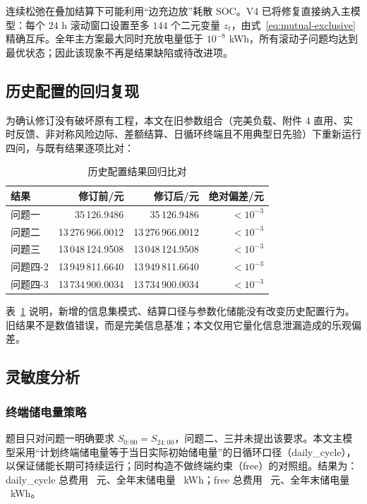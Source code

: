 连续松弛在叠加结算下可能利用“边充边放”耗散 SOC。V4 已将修复直接纳入主模型：每个 $24$ h 滚动窗口设置至多 $144$ 个二元变量 $z_t$，由式~\eqref{eq:mutual-exclusive} 精确互斥。全年主方案最大同时充放电量低于 $10^{-8}$ kWh，所有滚动子问题均达到最优状态；因此该现象不再是结果缺陷或待改进项。

\subsection{历史配置的回归复现}

为确认修订没有破坏原有工程，本文在旧参数组合（完美负载、附件 4 直用、实时反馈、非对称风险边际、差额结算、日循环终端且不用典型日先验）下重新运行四问，与既有结果逐项比对：

\begin{table}[htbp]
	\caption{历史配置结果回归比对}
	\label{tab:regression}
	\centering
	\begin{tabular}{l r r r}
		\toprule
		结果 & 修订前/元 & 修订后/元 & 绝对偏差/元 \\
		\midrule
		问题一 & 35\,126.9486 & 35\,126.9486 & $<10^{-3}$ \\
		问题二 & 13\,276\,966.0012 & 13\,276\,966.0012 & $<10^{-3}$ \\
		问题三 & 13\,048\,124.9508 & 13\,048\,124.9508 & $<10^{-3}$ \\
		问题四-2 & 13\,949\,811.6640 & 13\,949\,811.6640 & $<10^{-3}$ \\
		问题四-3 & 13\,734\,900.0034 & 13\,734\,900.0034 & $<10^{-3}$ \\
		\bottomrule
	\end{tabular}
\end{table}

表~\ref{tab:regression} 说明，新增的信息集模式、结算口径与参数化储能没有改变历史配置行为。旧结果不是数值错误，而是完美信息基准；本文仅用它量化信息泄漏造成的乐观偏差。

\subsection{灵敏度分析}

\subsubsection{终端储电量策略}
\label{sec:terminal}

题目只对问题一明确要求 $S_{0{:}00}=S_{24{:}00}$，问题二、三并未提出该要求。本文主模型采用“计划终端储电量等于当日实际初始储电量”的日循环口径（daily\_cycle），以保证储能长期可持续运行；同时构造不做终端约束（free）的对照组。结果为：daily\_cycle 总费用 \SensTerminalCycle\ 元、全年末储电量 \SensTerminalCycleSoc\ kWh；free 总费用 \SensTerminalFree\ 元、全年末储电量 \SensTerminalFreeSoc\ kWh。

